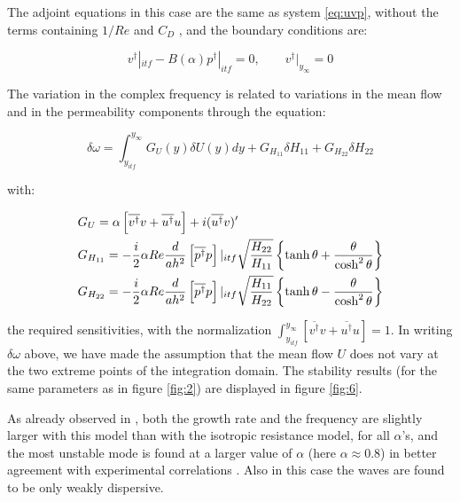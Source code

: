The adjoint equations in this case are the same as system \eqref{eq:uvp}, without the terms containing $1/Re$
and $C_D$ , and the boundary conditions are:

\begin{equation}
v^{\dagger}|_{itf} - B(\alpha) p^{\dagger}|_{itf} = 0, \qquad v^{\dagger}|_{y_{\infty}} = 0
\label{eq:darcybc_adjoint}
\end{equation}

\newpage
The variation in the complex frequency is related to variations in the mean flow and in the permeability components through the equation:

$$
\delta \omega = \int_{y_{itf}}^{y_{\infty}}  G_U(y) \delta U(y) dy + G_{{H}_{11}} \delta {H}_{11} + G_{{H}_{22}} \delta {H}_{22}
$$


with:

\begin{equation}
\begin{split}
& G_U = \alpha  \left[  \overline{v^{\dagger}} v +  \overline{u^{\dagger}} u \right] + i ( \overline{u^{\dagger}} v)'  \vspace{0.3cm}\\
& G_{{H}_{11}} = -\dfrac{i}{2} \alpha Re \dfrac{d}{a h^2}  \left[  \overline{p^{\dagger}} p \right]|_{itf} \sqrt{\dfrac{{H}_{22}}{{H}_{11}}} \left\lbrace \tanh \theta + \dfrac{\theta}{\cosh^2 \theta}\right\rbrace	\vspace{0.3cm}\\
& G_{ {H}_{22}} = -\dfrac{i}{2} \alpha Re \dfrac{d}{a h^2}  \left[  \overline{p^{\dagger}} p \right]|_{itf} \sqrt{\dfrac{ {H}_{11}}{ {H}_{22}}} \left\lbrace \tanh \theta - \dfrac{\theta}{\cosh^2 \theta}\right\rbrace
\end{split}
\end{equation}


the required sensitivities, with the normalization  $\int_{y_{itf}}^{y_{\infty}} \left[  \overline{v^{\dagger}} v +  \overline{u^{\dagger}} u \right] = 1$.
In writing $\delta \omega$ above, we have made the assumption that the mean flow $U$ does not vary at the two extreme points of the
integration domain.
The stability results (for the same parameters as in figure \ref{fig:2}) are displayed in figure \ref{fig:6}. 


As already observed in \citet{zampogna2016instability}, both the growth rate and the frequency are slightly larger with this model than
with the isotropic resistance model, for all $\alpha$’s, and the most unstable mode is found at a larger
value of $\alpha$ (here $\alpha \approx 0.8$) in better agreement with experimental correlations \citet{zampogna2016instability} \citet{raupach1996coherent}.  Also in this case the
waves are found to be only weakly dispersive.


